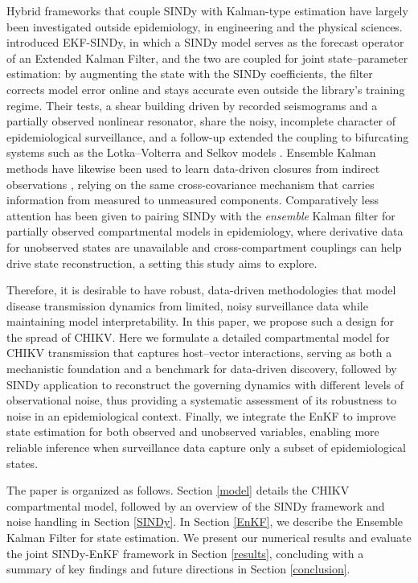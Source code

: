 \documentclass[9pt]{article}
\numberwithin{equation}{section}
\begin{document}
Hybrid frameworks that couple SINDy with Kalman-type estimation have largely been investigated outside epidemiology, in engineering and the physical sciences. \citet{rosafalco2024ekf} introduced EKF-SINDy, in which a SINDy model serves as the forecast operator of an Extended Kalman Filter, and the two are coupled for joint state--parameter estimation: by augmenting the state with the SINDy coefficients, the filter corrects model error online and stays accurate even outside the library's training regime. Their tests, a shear building driven by recorded seismograms and a partially observed nonlinear resonator, share the noisy, incomplete character of epidemiological surveillance, and a follow-up extended the coupling to bifurcating systems such as the Lotka--Volterra and Selkov models \cite{rosafalco2024online}. Ensemble Kalman methods have likewise been used to learn data-driven closures from indirect observations \cite{zhang2022ensemble}, relying on the same cross-covariance mechanism that carries information from measured to unmeasured components. Comparatively less attention has been given to pairing SINDy with the \emph{ensemble} Kalman filter for partially observed compartmental models in epidemiology, where derivative data for unobserved states are unavailable and cross-compartment couplings can help drive state reconstruction, a setting this study aims to explore.

Therefore, it is desirable to have robust, data-driven methodologies that model disease transmission dynamics from limited, noisy surveillance data while maintaining model interpretability. In this paper, we propose such a design for the spread of CHIKV. Here we formulate a detailed compartmental model for CHIKV transmission that captures host–vector interactions, serving as both a mechanistic foundation and a benchmark for data-driven discovery, followed by SINDy application to reconstruct the governing dynamics with different levels of observational noise, thus providing a systematic assessment of its robustness to noise in an epidemiological context. Finally, we integrate the EnKF to improve state estimation for both observed and unobserved variables, enabling more reliable inference when surveillance data capture only a subset of epidemiological states.

The paper is organized as follows. Section \ref{model} details the CHIKV compartmental model, followed by an overview of the SINDy framework and noise handling in Section \ref{SINDy}. In Section \ref{EnKF}, we describe the Ensemble Kalman Filter for state estimation. We present our numerical results and evaluate the joint SINDy-EnKF framework in Section \ref{results}, concluding with a summary of key findings and future directions in Section \ref{conclusion}.
\end{document}
